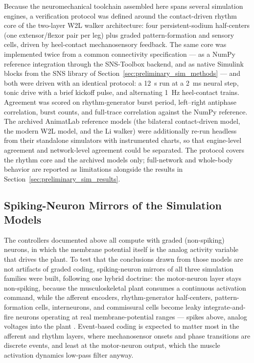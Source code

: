Because the neuromechanical toolchain assembled here spans several simulation engines, a verification protocol was defined around the contact-driven rhythm core of the two-layer W2L walker architecture: four persistent-sodium half-centers (one extensor/flexor pair per leg) plus graded pattern-formation and sensory cells, driven by heel-contact mechanosensory feedback. The same core was implemented twice from a common connectivity specification --- as a NumPy reference integration through the SNS-Toolbox backend, and as native Simulink blocks from the SNS library of Section~\ref{sec:preliminary_sim_methods} --- and both were driven with an identical protocol: a \qty{12}{\second} run at a \qty{2}{\milli\second} neural step, tonic drive with a brief kickoff pulse, and alternating \qty{1}{\Hz} heel-contact trains. Agreement was scored on rhythm-generator burst period, left--right antiphase correlation, burst counts, and full-trace correlation against the NumPy reference. The archived AnimatLab reference models (the bilateral contact-driven model, the modern W2L model, and the Li walker) were additionally re-run headless from their standalone simulators with instrumented charts, so that engine-level agreement and network-level agreement could be separated. The protocol covers the rhythm core and the archived models only; full-network and whole-body behavior are reported as limitations alongside the results in Section~\ref{sec:preliminary_sim_results}.

\subsection{Spiking-Neuron Mirrors of the Simulation Models}\label{sec:spiking_methods}

The controllers documented above all compute with graded (non-spiking) neurons, in which the membrane potential itself is the analog activity variable that drives the plant. To test that the conclusions drawn from those models are not artifacts of graded coding, spiking-neuron mirrors of all three simulation families were built, following one hybrid doctrine: the motor-neuron layer stays non-spiking, because the musculoskeletal plant consumes a continuous activation command, while the afferent encoders, rhythm-generator half-centers, pattern-formation cells, interneurons, and commissural cells become leaky integrate-and-fire neurons operating at real membrane-potential ranges --- spikes above, analog voltages into the plant \citep{szczecinski_perspective_2023, nourse_sns_2023}. Event-based coding is expected to matter most in the afferent and rhythm layers, where mechanosensor onsets and phase transitions are discrete events, and least at the motor-neuron output, which the muscle activation dynamics low-pass filter anyway.

